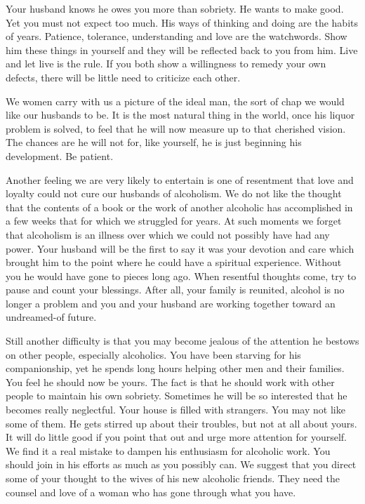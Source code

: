 \begin{biblechapter}
Your husband knows he owes you more than sobriety.  He wants to make good.  Yet you must not expect too much.  His ways of thinking and doing are the habits of years.  Patience, tolerance, understanding and love are the watchwords.  Show him these things in yourself and they will be reflected back to you from him.  Live and let live is the rule.  If you both show a willingness to remedy your own defects, there will be little need to criticize each other.

We women carry with us a picture of the ideal man, the sort of chap we would like our husbands to be.  It is the most natural thing in the world, once his liquor problem is solved, to feel that he will now measure up to that cherished vision.  The chances are he will not for, like yourself, he is just beginning his development.  Be patient.

Another feeling we are very likely to entertain is one of resentment that love and loyalty could not cure our husbands of alcoholism.  We do not like the thought that the contents of a book or the work of another alcoholic has accomplished in a few weeks that for which we struggled for years.  At such moments we forget that alcoholism is an illness over which we could not possibly have had any power.  Your husband will be the first to say it was your devotion and care which brought him to the point where he could have a spiritual experience.  Without you he would have gone to pieces long ago.  When resentful thoughts come, try to pause and count your blessings.  After all, your family is reunited, alcohol is no longer a problem and you and your husband are working together toward an undreamed-of future.

Still another difficulty is that you may become jealous of the attention he bestows on other people, especially alcoholics.  You have been starving for his companionship, yet he spends long hours helping other men and their families.  You feel he should now be yours.  The fact is that he should work with other people to maintain his own sobriety.  Sometimes he will be so interested that he becomes really neglectful.  Your house is filled with strangers.  You may not like some of them.  He gets stirred up about their troubles, but not at all about yours.  It will do little good if you point that out and urge more attention for yourself.  We find it a real mistake to dampen his enthusiasm for alcoholic work.  You should join in his efforts as much as you possibly can.  We suggest that you direct some of your thought to the wives of his new alcoholic friends.  They need the counsel and love of a woman who has gone through what you have.


\end{biblechapter}
